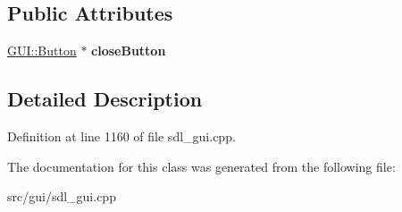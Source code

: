 \subsection*{Public Attributes}
\begin{DoxyCompactItemize}
\item 
\hypertarget{classConfigurationWindow_a95eb72938fb54063c6c5094f47901c1d}{\hyperlink{classGUI_1_1Button}{G\-U\-I\-::\-Button} $\ast$ {\bfseries close\-Button}}\label{classConfigurationWindow_a95eb72938fb54063c6c5094f47901c1d}

\end{DoxyCompactItemize}


\subsection{Detailed Description}


Definition at line 1160 of file sdl\-\_\-gui.\-cpp.



The documentation for this class was generated from the following file\-:\begin{DoxyCompactItemize}
\item 
src/gui/sdl\-\_\-gui.\-cpp\end{DoxyCompactItemize}
